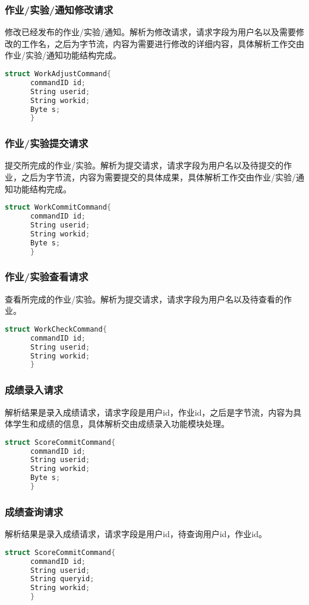    \subsubsection{作业/实验/通知修改请求}
    修改已经发布的作业/实验/通知。解析为修改请求，请求字段为用户名以及需要修改的工作名，之后为字节流，内容为需要进行修改的详细内容，具体解析工作交由作业/实验/通知功能结构完成。
    \begin{lstlisting}[language=C,caption=作业/实验/通知修改请求]
      struct WorkAdjustCommand{
      commandID id;
      String userid;
      String workid;
      Byte s;
      }
    \end{lstlisting}
    \subsubsection{作业/实验提交请求}
    提交所完成的作业/实验。解析为提交请求，请求字段为用户名以及待提交的作业，之后为字节流，内容为需要提交的具体成果，具体解析工作交由作业/实验/通知功能结构完成。
    \begin{lstlisting}[language=C,caption=作业/实验提交请求]
      struct WorkCommitCommand{
      commandID id;
      String userid;
      String workid;
      Byte s;
      }
    \end{lstlisting}
    \subsubsection{作业/实验查看请求}
    查看所完成的作业/实验。解析为提交请求，请求字段为用户名以及待查看的作业。
    \begin{lstlisting}[language=C,caption=作业/实验查看请求]
      struct WorkCheckCommand{
      commandID id;
      String userid;
      String workid;
      }
    \end{lstlisting}
    \subsubsection{成绩录入请求}
    解析结果是录入成绩请求，请求字段是用户id，作业id，之后是字节流，内容为具体学生和成绩的信息，具体解析交由成绩录入功能模块处理。
    \begin{lstlisting}[language=C,caption=成绩录入请求]
      struct ScoreCommitCommand{
      commandID id;
      String userid;
      String workid;
      Byte s;
      }
    \end{lstlisting}
    \subsubsection{成绩查询请求}
    解析结果是录入成绩请求，请求字段是用户id，待查询用户id，作业id。
    \begin{lstlisting}[language=C,caption=成绩查询请求]
      struct ScoreCommitCommand{
      commandID id;
      String userid;
      String queryid;
      String workid;
      }
    \end{lstlisting}
